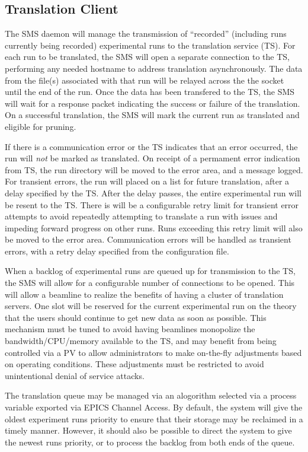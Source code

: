 \subsection{Translation Client}

The SMS daemon will manage the transmission of ``recorded'' (including runs
currently being recorded) experimental runs to the translation service (TS).
For each run to be translated, the SMS will open a separate connection to the
TS, performing any needed hostname to address translation asynchronously. The
data from the file(s) associated with that run will be relayed across the the
socket until the end of the run. Once the data has been transfered to the TS,
the SMS will wait for a response packet indicating the success or failure of
the translation.  On a successful translation, the SMS will mark the current
run as translated and eligible for pruning.

If there is a communication error or the TS indicates that an error occurred,
the run will \emph{not} be marked as translated. On receipt of a permament
error indication from TS, the run directory will be moved to the error area,
and a message logged. For transient errors, the run will placed on a list for
future translation, after a delay specified by the TS. After the delay passes,
the entire experimental run will be resent to the TS. There is will be a
configurable retry limit for transient error attempts to avoid repeatedly
attempting to translate a run with issues and impeding forward progress on
other runs.  Runs exceeding this retry limit will also be moved to the error
area. Communication errors will be handled as transient errors, with a retry
delay specified from the configuration file.

When a backlog of experimental runs are queued up for transmission to the TS,
the SMS will allow for a configurable number of connections to be opened. This
will allow a beamline to realize the benefits of having a cluster of
translation servers. One slot will be reserved for the current experimental run
on the theory that the users should continue to get new data as soon as
possible. This mechanism must be tuned to avoid having beamlines monopolize
the bandwidth/CPU/memory available to the TS, and may benefit from being
controlled via a PV to allow administrators to make on-the-fly adjustments
based on operating conditions. These adjustments must be restricted to
avoid unintentional denial of service attacks.

The translation queue may be managed via an alogorithm selected via a process
variable exported via EPICS Channel Access. By default, the system will
give the oldest experiment runs priority to ensure that their storage may
be reclaimed in a timely manner. However, it should also be possible to
direct the system to give the newest runs priority, or to process the backlog
from both ends of the queue.

